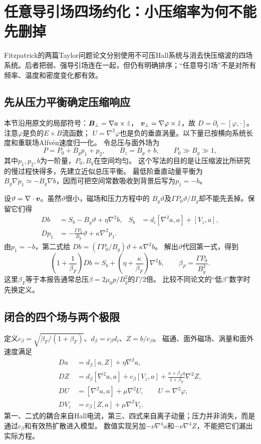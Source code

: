 \section{任意导引场四场约化：小压缩率为何不能先删掉}
Fitzpatrick的两篇Taylor问题论文分别使用不可压Hall系统与消去快压缩波的四场系统。后者把弱、强导引场连在一起，但仍有明确排序；“任意导引场”不是对所有频率、温度和密度变化都有效。\citep{L057,L058}

\subsection{先从压力平衡确定压缩响应}
本节沿用原文的局部符号：$\bm{B}_\perp=\nabla a\times\hat z$，
$\bm{v}_\perp=\nabla\varphi\times\hat z$，故
$D=\partial_t-[\varphi,\cdot]$。注意$\varphi$是负的$E\times B$流函数；
$U=\nabla^2\varphi$也是负的垂直涡量。以下量已按横向系统长度和重联场Alfvén速度归一化。
令总压与面外场为
\begin{equation}
 P=P_0+B_g p_1+p_2,\qquad B_z=B_g+b,
 \qquad P_0\gg B_g\gg1,
\end{equation}
其中$p_1,p_2,b$为一阶量，$P_0,B_g$在空间均匀。
这个写法的目的是让压缩波比所研究的慢过程快得多，先建立近似总压平衡。
最低阶垂直动量平衡为
$B_g\nabla p_1\simeq-B_g\nabla b$，因而可把空间常数吸收到背景后写为$p_1=-b$。

设$\vartheta=\nabla\cdot\bm{v}$。虽然$\vartheta$很小，磁场和压力方程中的
$B_g\vartheta$及$\Gamma P_0\vartheta/B_g$却不能先丢掉。保留它们得
\begin{align}
 Db&=S_b-B_g\vartheta+\eta\nabla^2b,
 &S_b&=d_i[\nabla^2a,a]+[V_z,a],\\
 Dp_1&=-\frac{\Gamma P_0}{B_g}\vartheta+\kappa\nabla^2p_1.
\end{align}
由$p_1=-b$，第二式给
$Db=(\Gamma P_0/B_g)\vartheta+\kappa\nabla^2b$。
解出$\vartheta$代回第一式，得到
\begin{equation}
 \left(1+\frac1{\beta_F}\right)Db
 =S_b+\left(\eta+\frac{\kappa}{\beta_F}\right)\nabla^2b,
 \qquad \beta_F=\frac{\Gamma P_0}{B_g^2}.
\end{equation}
这里$\beta_F$等于本报告通常总压$\beta=2\mu_0p/B_g^2$的$\Gamma/2$倍。
比较不同论文的“低$\beta$”数字时先换定义。

\subsection{闭合的四个场与两个极限}
定义$c_\beta=\sqrt{\beta_F/(1+\beta_F)}$、$d_\beta=c_\beta d_i$、$Z=b/c_\beta$。
磁通、面外磁场、涡量和面外速度满足
\begin{align}
 Da&=d_\beta[a,Z]+\eta\nabla^2a,\\
 DZ&=d_\beta[\nabla^2a,a]+c_\beta[V_z,a]
       +\frac{\kappa+\beta_F\eta}{1+\beta_F}\nabla^2Z,\\
 DU&=[\nabla^2a,a]+\mu\nabla^2U,\qquad U=\nabla^2\varphi,\\
 DV_z&=c_\beta[Z,a]+\mu\nabla^2V_z.
 \label{eq:fitzfour}
\end{align}
第一、二式的耦合来自Hall电流，第三、四式来自离子动量；压力并非消失，而是通过$c_\beta$和有效热扩散进入模型。
数值实现另加$-\nu\nabla^4a$和$-\nu\nabla^4Z$，不能把它们漏出实际方程。

